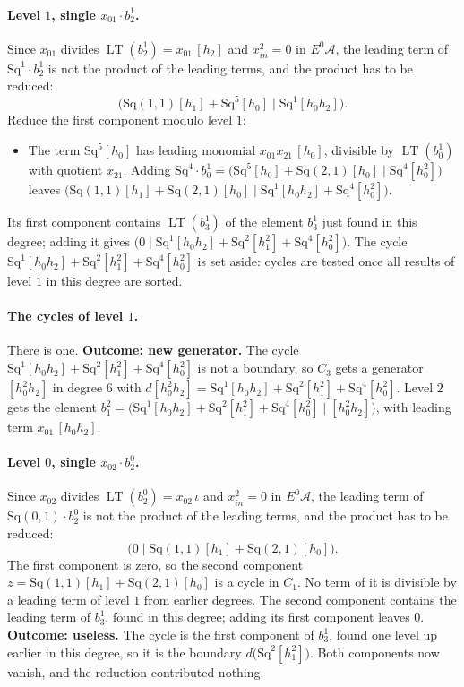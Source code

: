 \documentclass[11pt]{article}
\newcommand{\Sq}{\mathrm{Sq}}
\newcommand{\A}{\mathcal{A}}
\DeclareMathOperator{\LT}{LT}
\begin{document}
\paragraph{Level $1$, single $x_{01}\cdot b^{1}_{2}$.} Since $x_{01}$ divides $\LT(b^{1}_{2}) = x_{01}\,[h_2]$ and $x_{in}^2 = 0$ in $E^0\A$, the leading term of $\Sq^{1}\cdot b^{1}_{2}$ is not the product of the leading terms, and the product has to be reduced:
\[\bigl(\Sq(1,1)[h_1] + \Sq^{5}[h_0] \;\big|\; \Sq^{1}[h_0h_2]\bigr).\]
Reduce the first component modulo level $1$:
\begin{itemize}
\item The term $\Sq^{5}[h_0]$ has leading monomial $x_{01}x_{21}\,[h_0]$, divisible by $\LT(b^{1}_{0})$ with quotient $x_{21}$. Adding $\Sq^{4}\cdot b^{1}_{0} = \bigl(\Sq^{5}[h_0] + \Sq(2,1)[h_0] \;\big|\; \Sq^{4}[h_0^2]\bigr)$ leaves $\bigl(\Sq(1,1)[h_1] + \Sq(2,1)[h_0] \;\big|\; \Sq^{1}[h_0h_2] + \Sq^{4}[h_0^2]\bigr)$.
\end{itemize}
Its first component contains $\LT(b^{1}_{3})$ of the element $b^{1}_{3}$ just found in this degree; adding it gives $\bigl(0 \;\big|\; \Sq^{1}[h_0h_2] + \Sq^{2}[h_1^2] + \Sq^{4}[h_0^2]\bigr)$.
The cycle $\Sq^{1}[h_0h_2] + \Sq^{2}[h_1^2] + \Sq^{4}[h_0^2]$ is set aside: cycles are tested once all results of level $1$ in this degree are sorted.
\medskip
\paragraph{The cycles of level $1$.} There is one.
\textbf{Outcome: new generator.} The cycle $\Sq^{1}[h_0h_2] + \Sq^{2}[h_1^2] + \Sq^{4}[h_0^2]$ is not a boundary, so $C_{3}$ gets a generator $[h_0^2h_2]$ in degree $6$ with $d[h_0^2h_2] = \Sq^{1}[h_0h_2] + \Sq^{2}[h_1^2] + \Sq^{4}[h_0^2]$.
Level $2$ gets the element $b^{2}_{1} = \bigl(\Sq^{1}[h_0h_2] + \Sq^{2}[h_1^2] + \Sq^{4}[h_0^2] \;\big|\; [h_0^2h_2]\bigr)$, with leading term $x_{01}\,[h_0h_2]$.
\medskip
\paragraph{Level $0$, single $x_{02}\cdot b^{0}_{2}$.} Since $x_{02}$ divides $\LT(b^{0}_{2}) = x_{02}\,\iota$ and $x_{in}^2 = 0$ in $E^0\A$, the leading term of $\Sq(0,1)\cdot b^{0}_{2}$ is not the product of the leading terms, and the product has to be reduced:
\[\bigl(0 \;\big|\; \Sq(1,1)[h_1] + \Sq(2,1)[h_0]\bigr).\]
The first component is zero, so the second component $z = \Sq(1,1)[h_1] + \Sq(2,1)[h_0]$ is a cycle in $C_{1}$.
No term of it is divisible by a leading term of level $1$ from earlier degrees.
The second component contains the leading term of $b^{1}_{3}$, found in this degree; adding its first component leaves $0$.
\textbf{Outcome: useless.} The cycle is the first component of $b^{1}_{3}$, found one level up earlier in this degree, so it is the boundary $d\bigl(\Sq^{2}[h_1^2]\bigr)$. Both components now vanish, and the reduction contributed nothing.
\medskip
\end{document}
